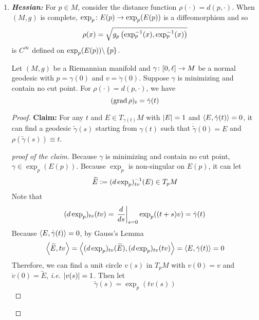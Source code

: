 \begin{enumerate}[label=\arabic{*}]
	\item \emph{\textbf{Hessian:}} For $p \in M$, consider the distance function $\rho(\cdot) = d(p,\cdot)$. When $(M,g)$ is complete, $\exp_p \colon E(p) \rightarrow \exp_p(E(p))$ is a diffeomorphism and so
	\begin{equation*}
		\rho(x) = \sqrt{g_p\left(\exp_p^{-1}(x),\exp_p^{-1}(x)\right)}
	\end{equation*}
	is $C^\infty$ defined on $\exp_p(E(p)) \backslash \left\{p\right\}$.

	\begin{lem}
		Let $(M,g)$ be a Riemannian manifold and $\gamma \colon [0,\ell] \rightarrow M$ be a normal geodesic with $p = \gamma(0)$ and $v = \dot{\gamma}(0)$. Suppose $\gamma$ is minimizing and contain no cut point. For $\rho(\cdot) = d(p,\cdot)$, we have
		\begin{equation*}
			(\operatorname{grad}\rho)_t = \dot{\gamma}(t)
		\end{equation*}
	\end{lem}
	\begin{proof}
		\textbf{Claim:} For any $t$ and $E \in T_{\gamma(t)}M$ with $\left\lvert E\right\lvert = 1$ and $\left\langle E,\dot{\gamma}(t) \right\rangle = 0$, it can find a geodesic $\widetilde{\gamma}(s)$ starting from $\gamma(t)$ such that $\dot{\widetilde{\gamma}}(0) = E$ and $\rho(\widetilde{\gamma}(s)) \equiv t$. 
		\begin{proof}[proof of the claim]
			Because $\gamma$ is minimizing and contain no cut point, $\gamma \in \exp_p(E(p))$. Because $\exp_p$ is non-singular on $E(p)$, it can let
			\begin{equation*}
				\widetilde{E}\vcentcolon=(d\exp_p)_{tv}^{-1}(E) \in T_pM
			\end{equation*}
			Note that
			\begin{equation*}
				(d\exp_p)_{tv}(tv) = \left.\frac{d}{ds}\right\lvert_{s=0}\exp_p((t+s)v) = \dot{\gamma}(t)
			\end{equation*}
			Because $\left\langle E,\dot{\gamma}(t) \right\rangle = 0$, by Gauss's Lemma
			\begin{equation*}
				\left\langle \widetilde{E},tv \right\rangle = \left\langle (d\exp_p)_{tv}(\widetilde{E}),(d\exp_p)_{tv}(tv) \right\rangle = \left\langle E,\dot{\gamma}(t) \right\rangle = 0
			\end{equation*}
			Therefore, we can find a unit circle $v(s)$ in $T_pM$ with $v(0) = v$ and $\dot{v}(0) = \widetilde{E}$, \emph{i.e.} $\left\lvert v(s)\right\lvert = 1$. Then let
			\begin{equation*}
				\widetilde{\gamma}(s) = \exp_p(tv(s))
			\end{equation*}

\end{proof}
\end{proof}
\end{enumerate}

